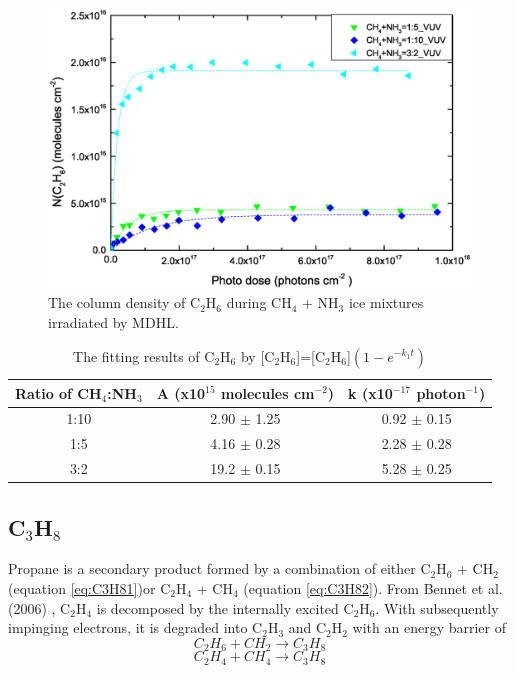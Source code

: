 \begin{figure}
\centering
\includegraphics[width=\textwidth]{figures/chapter3/Lab_C2H6.eps}
\caption{The column density of C$_2$H$_6$ during CH$_4$ + NH$_3$ ice mixtures irradiated by MDHL. }
\label{fig:lab_C2H6}
\end{figure}

\begin{table}[htbp]
\caption{The fitting results of C$_2$H$_6$ by [C$_2$H$_6$]=[C$_2$H$_6$]$(1 - e^{-k_1 t})$}
\label{tab:fittingC2H6}
\begin{tabular}{ccc}
\hline
\hline
Ratio of CH$_4$:NH$_3$ & A (x10$^{15}$ molecules cm$^{-2}$) & k (x10$^{-17}$ photon$^{-1}$) \\
\hline
1:10 & 2.90 $\pm$ 1.25 & 0.92 $\pm$ 0.15 \\
1:5 & 4.16 $\pm$ 0.28 & 2.28 $\pm$ 0.28 \\
3:2 & 19.2 $\pm$ 0.15 & 5.28 $\pm$ 0.25 \\
\hline
\end{tabular}
\end{table}


\subsection{C$_3$H$_8$}

Propane is a secondary product formed by a combination of either C$_2$H$_6$ + CH$_2$ (equation \ref{eq:C3H81})or C$_2$H$_4$ + CH$_4$ (equation \ref{eq:C3H82}). From Bennet et al. (2006) \cite{bennett2006laboratory}, C$_2$H$_4$ is decomposed by the internally excited C$_2$H$_6$. With subsequently impinging electrons, it is degraded into C$_2$H$_3$ and C$_2$H$_2$ with an energy barrier of 
\begin{equation}
C_2H_6 + CH_2 \rightarrow C_3H_8
\label{eq:C3H81}
\end{equation}
\begin{equation}
C_2H_4 + CH_4 \rightarrow C_3H_8
\label{eq:C3H82}
\end{equation}

